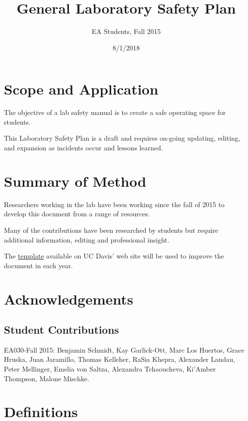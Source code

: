 \documentclass[12pt]{../SOP4_alpha}\usepackage[]{graphicx}\usepackage[]{color}
\title{General Laboratory Safety Plan}
\date{8/1/2018}
\author{EA Students, Fall 2015}
\begin{document}
\maketitle


\section{Scope and Application}

\NP The objective of a lab safety manual is to create a safe operating space for students.

\NP This Laboratory Safety Plan is a draft and requires on-going updating, editing, and expansion as incidents occur and lessons learned. 


\section{Summary of Method}

\NP Researchers working in the lab have been working since the fall of 2015 to develop this document from a range of resources. 

\NP Many of the contributions have been researched by students but require additional information, editing and professional insight.

\NP The \href{http://safetyservices.ucdavis.edu/sites/default/files/documents/LabSafetyPlan_Template.docx}{template} available on UC Davis' web site will be used to improve the document in each year.

\newpage
\tableofcontents

\section{Acknowledgements}

\subsection*{Student Contributions}

\NP EA030-Fall 2015: Benjamin Schmidt, Kay Garlick-Ott, Marc Los Huertos, Grace Hruska, Juan Jaramillo, Thomas Kelleher, RaSia Khepra, Alexander Landau, Peter Mellinger, Emelia von Saltza, Alexandra Tchaoucheva, Ki'Amber Thompson, Malone Mischke.


\section{Definitions}
\end{document}
